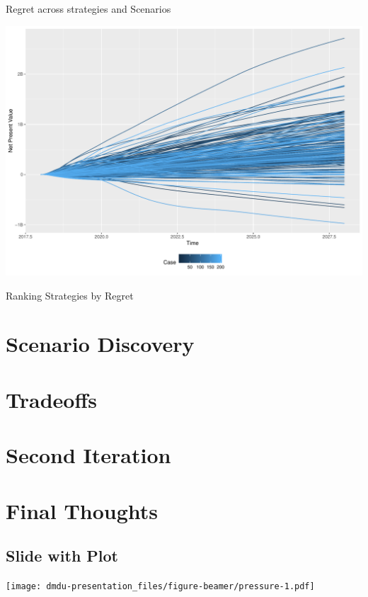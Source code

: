 \documentclass[ignorenonframetext,]{beamer}
\begin{document}
\begin{frame}{Regret across strategies and Scenarios}

\begin{center}\includegraphics{dmdu-presentation_files/figure-beamer/unnamed-chunk-5-1} \end{center}

\end{frame}

\begin{frame}{Ranking Strategies by Regret}

\end{frame}

\section{Scenario Discovery}\label{scenario-discovery}

\section{Tradeoffs}\label{tradeoffs}

\section{Second Iteration}\label{second-iteration}

\section{Final Thoughts}\label{final-thoughts}

\subsection{Slide with Plot}\label{slide-with-plot}

\texttt{[image: dmdu-presentation\_files/figure-beamer/pressure-1.pdf]}
\end{document}
